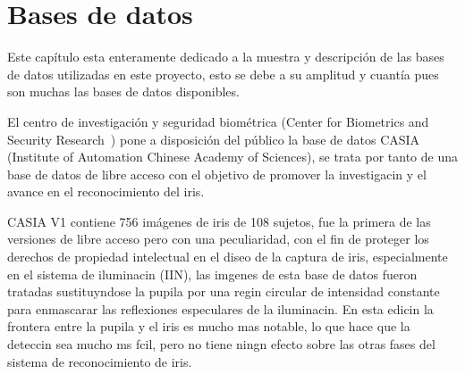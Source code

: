 \chapter{Bases de datos}
\label{chap:databases}

Este capítulo esta enteramente dedicado a la muestra y descripción de las bases de datos utilizadas en este proyecto, esto se debe a su amplitud y cuantía pues son muchas las bases de datos disponibles.

 \label{sec:CASIA_database}

El centro de investigación y seguridad biométrica (Center for Biometrics and Security Research~\cite{database:CASIA_web}) pone a disposición del público la base de datos CASIA (Institute of Automation Chinese Academy of Sciences), se trata por tanto de una base de datos de libre acceso con el objetivo de promover la investigacin y el avance en el reconocimiento del iris.

CASIA V1 contiene 756 imágenes de iris de 108 sujetos, fue la primera de las versiones de libre acceso pero con una peculiaridad, con el fin de proteger los derechos de propiedad intelectual en el diseo de la captura de iris, especialmente en el sistema de iluminacin (IIN), las imgenes de esta base de datos fueron tratadas sustituyndose la pupila por una regin circular de intensidad constante para enmascarar las reflexiones especulares de la iluminacin. En esta edicin la frontera entre la pupila y el iris es mucho mas notable, lo que hace que la deteccin sea mucho ms fcil, pero no tiene ningn efecto sobre las otras fases del sistema de reconocimiento de iris.

